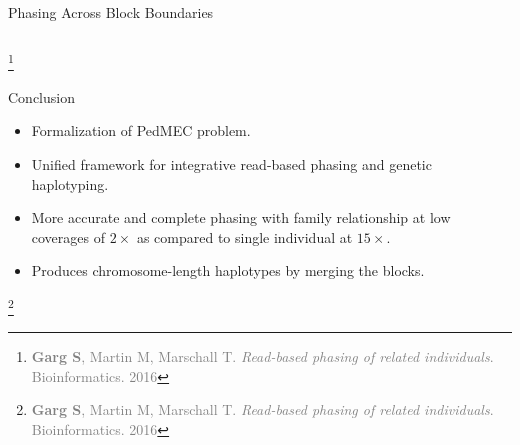 \documentclass[notes=hide]{beamer}
\begin{document}
\begin{frame}{Phasing Across Block Boundaries}
\begin{columns}[]
\begin{column}{\textwidth}
	\end{column}
		\end{columns}
	
	
\let\thefootnote\relax\footnote{\scriptsize\textcolor{gray}{\textbf{Garg S}, Martin M, Marschall T. \textit{Read-based phasing of related individuals}. Bioinformatics. 2016}}
\end{frame}

\begin{frame}{Conclusion}
	\begin{itemize}
		\item Formalization of PedMEC problem. 
		\item Unified framework for integrative read-based phasing and genetic haplotyping.
		\item More accurate and complete phasing with family relationship at low coverages of $2\times$ as compared to single individual at $15\times$.
		\item Produces chromosome-length haplotypes by merging the blocks.
	\end{itemize}
\let\thefootnote\relax\footnote{\scriptsize\textcolor{gray}{\textbf{Garg S}, Martin M, Marschall T. \textit{Read-based phasing of related individuals}. Bioinformatics. 2016}}
\end{frame}
\end{document}
